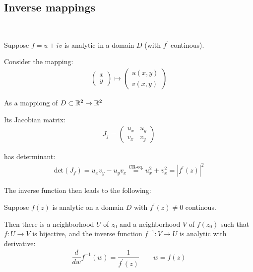 \subsection{Inverse mappings}\hfill\\\par
\noindent Suppose $f = u+iv$ is analytic in a domain $D$ (with $f^{\prime}$ continous).\par
\noindent Consider the mapping:
\begin{equation*}
  \begin{gathered}
  \begin{pmatrix}x\\y\end{pmatrix}\mapsto\begin{pmatrix}u(x,y)\\v(x,y)\end{pmatrix}
  \end{gathered}
\end{equation*}\par
\noindent As a mappiong of $D\subset\mathbb{R}^2\to\mathbb{R}^2$
\par\bigskip
\noindent Its Jacobian matrix:
\begin{equation*}
  \begin{gathered}
    J_f = \begin{pmatrix}u_x&u_y\\v_x&v_y\end{pmatrix}
  \end{gathered}
\end{equation*}\par
\noindent has determinant:
\begin{equation*}
  \begin{gathered}
    \text{det}(J_f) = u_xv_y-u_yv_x\stackrel{\text{CR-eq.}}{=} u_x^2+v_x^2 = \left|f^{\prime}(z)\right|^2
  \end{gathered}
\end{equation*}
\par\bigskip
\noindent The inverse function then leads to the following:
\par\bigskip
\begin{theo}{}
  Suppose $f(z)$ is analytic on a domain $D$ with $f^{\prime}(z)\neq0$ continous.\par
  \noindent Then there is a neighborhood $U$ of $z_0$ and a neighborhood $V$ of $f(z_0)$ such that $f:U\to V$ is bijective, and the inverse function $f^{-1}:V\to U$ is analytic with derivative:
  \begin{equation*}
    \begin{gathered}
      \dfrac{d}{d w}f^{-1}(w) = \dfrac{1}{f^{\prime}(z)}\qquad w = f(z)
    \end{gathered}
  \end{equation*}
\end{theo}
\newpage
